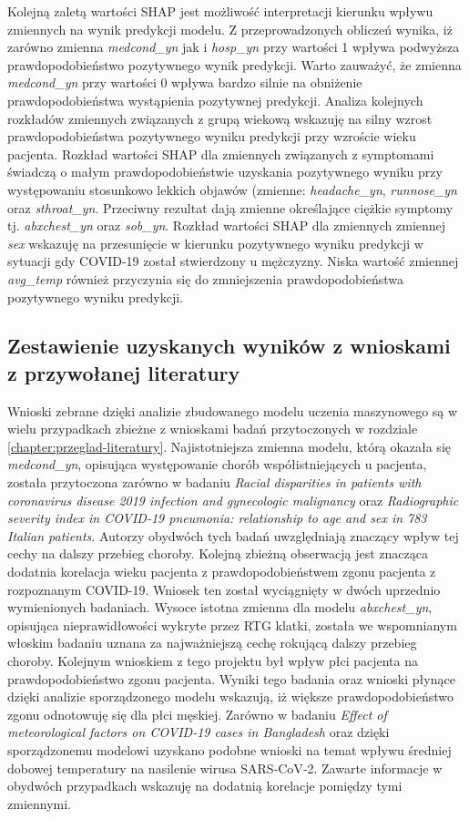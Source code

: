 \documentclass[polish, twoside, 12pt, a4paper]{article}
\theoremstyle{definition}
\theoremstyle{plain}
\theoremstyle{remark}
\begin{document}
Kolejną zaletą wartości SHAP jest możliwość interpretacji kierunku wpływu zmiennych na wynik predykcji modelu. Z przeprowadzonych obliczeń wynika, iż zarówno zmienna \emph{medcond\_yn} jak i \emph{hosp\_yn} przy wartości 1 wpływa podwyższa prawdopodobieństwo pozytywnego wynik predykcji. Warto zauważyć, że zmienna \emph{medcond\_yn} przy wartości 0 wpływa bardzo silnie na obniżenie prawdopodobieństwa wystąpienia pozytywnej predykcji. Analiza kolejnych rozkładów zmiennych związanych z grupą wiekową wskazuję na silny wzrost prawdopodobieństwa pozytywnego wyniku predykcji przy wzroście wieku pacjenta. Rozkład wartości SHAP dla zmiennych związanych z symptomami świadczą o małym prawdopodobieństwie uzyskania pozytywnego wyniku przy występowaniu stosunkowo lekkich objawów (zmienne: \emph{headache\_yn}, \emph{runnose\_yn} oraz \emph{sthroat\_yn}. Przeciwny rezultat dają zmienne określające ciężkie symptomy tj. \emph{abxchest\_yn} oraz \emph{sob\_yn}. Rozkład wartości SHAP dla zmiennych zmiennej \emph{sex} wskazuję na przesunięcie w kierunku pozytywnego wyniku predykcji w sytuacji gdy COVID-19 został stwierdzony u mężczyzny. Niska wartość zmiennej \emph{avg\_temp} również przyczynia się do zmniejszenia prawdopodobieństwa pozytywnego wyniku predykcji. 

\subsection{Zestawienie uzyskanych wyników z wnioskami z przywołanej literatury}

Wnioski zebrane dzięki analizie zbudowanego modelu uczenia maszynowego są w wielu przypadkach zbieżne z wnioskami badań przytoczonych w rozdziale \ref{chapter:przeglad-literatury}. Najistotniejsza zmienna modelu, którą okazała się \emph{medcond\_yn}, opisująca występowanie chorób współistniejących u pacjenta, została przytoczona zarówno w badaniu \emph{Racial disparities in patients with coronavirus disease 2019 infection and gynecologic malignancy} oraz \emph{Radiographic severity index in COVID-19 pneumonia: relationship to age and sex in 783 Italian patients}. Autorzy obydwóch tych badań uwzględniają znaczący wpływ tej cechy na dalszy przebieg choroby. Kolejną zbieżną obserwacją jest znacząca dodatnia korelacja wieku pacjenta z prawdopodobieństwem zgonu pacjenta z rozpoznanym COVID-19. Wniosek ten został wyciągnięty w dwóch uprzednio wymienionych badaniach. Wysoce istotna zmienna dla modelu \emph{abxchest\_yn}, opisująca nieprawidłowości wykryte przez RTG klatki, została we wspomnianym  włoskim badaniu uznana za najważniejszą cechę rokującą dalszy przebieg choroby. Kolejnym wnioskiem z tego projektu był wpływ płci pacjenta na prawdopodobieństwo zgonu pacjenta. Wyniki tego badania oraz wnioski płynące dzięki analizie sporządzonego modelu wskazują, iż większe prawdopodobieństwo zgonu odnotowuję się dla płci męskiej. Zarówno w badaniu \emph{Effect of meteorological factors on COVID-19 cases in Bangladesh} oraz dzięki sporządzonemu modelowi uzyskano podobne wnioski na temat wpływu średniej dobowej temperatury na nasilenie wirusa SARS‑CoV‑2. Zawarte informacje w obydwóch przypadkach wskazuję na dodatnią korelacje pomiędzy tymi zmiennymi.
\end{document}
